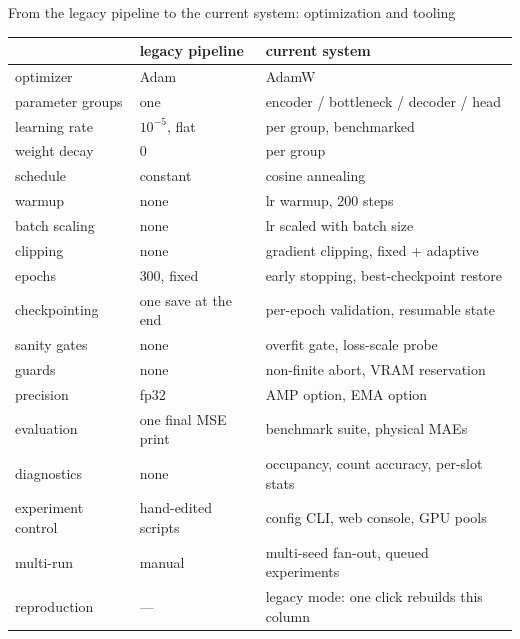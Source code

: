 \begin{frame}{From the legacy pipeline to the current system: optimization and tooling}
  \centering
  \scriptsize
  \renewcommand{\arraystretch}{1.12}
  \begin{tabular}{@{}l p{4.9cm} p{6.1cm}@{}}
    \toprule
    & \textbf{legacy pipeline} & \textbf{current system} \\
    \midrule
    optimizer           & Adam                                        & AdamW \\
    parameter groups    & one                                         & encoder / bottleneck / decoder / head \\
    learning rate       & $10^{-5}$, flat                             & per group, benchmarked \\
    weight decay        & 0                                           & per group \\
    schedule            & constant                                    & cosine annealing \\
    warmup              & none                                        & lr warmup, 200 steps \\
    batch scaling       & none                                        & lr scaled with batch size \\
    clipping            & none                                        & gradient clipping, fixed + adaptive \\
    \addlinespace[3pt]
    epochs              & 300, fixed                                  & early stopping, best-checkpoint restore \\
    checkpointing       & one save at the end                         & per-epoch validation, resumable state \\
    sanity gates        & none                                        & overfit gate, loss-scale probe \\
    guards              & none                                        & non-finite abort, VRAM reservation \\
    precision           & fp32                                        & AMP option, EMA option \\
    \addlinespace[3pt]
    evaluation          & one final MSE print                         & benchmark suite, physical MAEs \\
    diagnostics         & none                                        & occupancy, count accuracy, per-slot stats \\
    experiment control  & hand-edited scripts                         & config CLI, web console, GPU pools \\
    multi-run           & manual                                      & multi-seed fan-out, queued experiments \\
    reproduction        & \textcolor{soft}{---}                       & legacy mode: one click rebuilds this column \\
    \bottomrule
  \end{tabular}
\end{frame}
